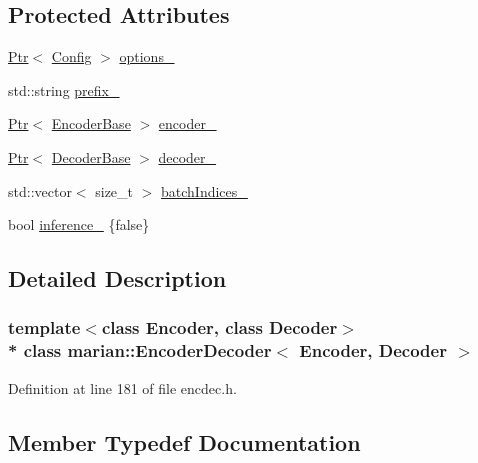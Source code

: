\subsection*{Protected Attributes}
\begin{DoxyCompactItemize}
\item 
\hyperlink{namespacemarian_ad1a373be43a00ef9ce35666145137b08}{Ptr}$<$ \hyperlink{classmarian_1_1Config}{Config} $>$ \hyperlink{classmarian_1_1EncoderDecoder_a467e7d547bd7888d1bea248e99cef212}{options\+\_\+}
\item 
std\+::string \hyperlink{classmarian_1_1EncoderDecoder_aeccce58b4406c58abd7ad596ff6b8eae}{prefix\+\_\+}
\item 
\hyperlink{namespacemarian_ad1a373be43a00ef9ce35666145137b08}{Ptr}$<$ \hyperlink{classmarian_1_1EncoderBase}{Encoder\+Base} $>$ \hyperlink{classmarian_1_1EncoderDecoder_a31a65f97ea313106b7f560ffac52e969}{encoder\+\_\+}
\item 
\hyperlink{namespacemarian_ad1a373be43a00ef9ce35666145137b08}{Ptr}$<$ \hyperlink{classmarian_1_1DecoderBase}{Decoder\+Base} $>$ \hyperlink{classmarian_1_1EncoderDecoder_a3e86046f2f51b1f2b146f366afea9c3b}{decoder\+\_\+}
\item 
std\+::vector$<$ size\+\_\+t $>$ \hyperlink{classmarian_1_1EncoderDecoder_a7ca0d84733de420d7103df7a9e65b7ad}{batch\+Indices\+\_\+}
\item 
bool \hyperlink{classmarian_1_1EncoderDecoder_a51626185014f44e369ca9ea8b9da7c10}{inference\+\_\+} \{false\}
\end{DoxyCompactItemize}


\subsection{Detailed Description}
\subsubsection*{template$<$class Encoder, class Decoder$>$\\*
class marian\+::\+Encoder\+Decoder$<$ Encoder, Decoder $>$}



Definition at line 181 of file encdec.\+h.



\subsection{Member Typedef Documentation}
